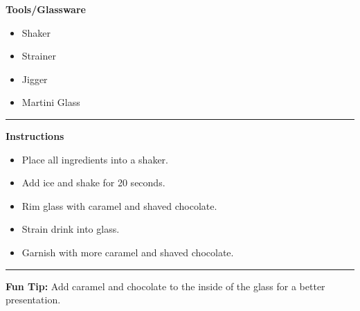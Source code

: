 \hspace{.01\textwidth}\vrule\hspace{.01\textwidth}
\begin{minipage}[t]{.49\textwidth}
    \noindent
    \textbf{\large Tools/Glassware}
    \begin{itemize}
        \item Shaker
        \item Strainer
        \item Jigger
        \item Martini Glass
    \end{itemize}
\end{minipage}
\vspace{.5em}\hrule\vspace{.5em}
\noindent
\begin{minipage}{\textwidth}
    \noindent
    \textbf{\large Instructions}
    \begin{itemize}
        \item Place all ingredients into a shaker.
        \item Add ice and shake for 20 seconds.
        \item Rim glass with caramel and shaved chocolate.
        \item Strain drink into glass.
        \item Garnish with more caramel and shaved chocolate.
    \end{itemize}
\end{minipage}
\vspace{.5em}\hrule\vspace{.5em}
\noindent
\textbf{\large Fun Tip:} Add caramel and chocolate to the inside of the glass for a better presentation.
\newpage
